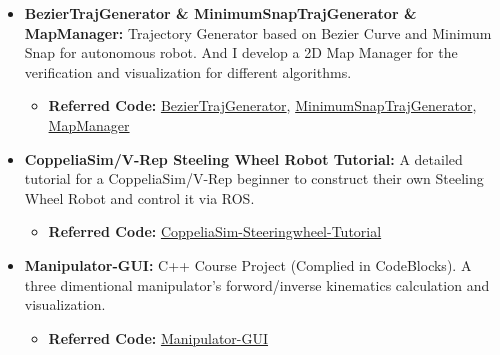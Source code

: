 \documentclass[11pt,a4paper,sans]{moderncv}        %
\begin{document}
{\begin{itemize}
\begin{itemize}
\item \textbf{Referred Code:} \href{https://github.com/jianhengLiu/quad_controller_SE3}{quad-controller-SE3}, \href{https://github.com/jianhengLiu/FlightController}{FlightController}

\item \textbf{Referred Video:} \href{https://www.bilibili.com/video/BV1xv411w7Md?share_source=copy_web}{Video1}, \href{https://www.bilibili.com/video/BV1rq4y1N76T?share_source=copy_web}{Video2}
\end{itemize}

\vspace{6pt}

\item \textbf{BezierTrajGenerator \& MinimumSnapTrajGenerator \& 
MapManager:} Trajectory Generator based on Bezier Curve and Minimum Snap for autonomous robot. And I develop a 2D Map Manager for the verification and visualization for different algorithms.

\begin{itemize}
\item \textbf{Referred Code:} \href{https://github.com/jianhengLiu/BezierTrajGenerator}{BezierTrajGenerator}, \href{https://github.com/jianhengLiu/MinimumSnapTrajGenerator}{MinimumSnapTrajGenerator}, \href{https://github.com/jianhengLiu/MapManager}{MapManager}
\end{itemize}

\vspace{6pt}

\item \textbf{CoppeliaSim/V-Rep Steeling Wheel Robot Tutorial:} A detailed tutorial for a CoppeliaSim/V-Rep beginner to construct their own Steeling Wheel Robot and control it via ROS.

\begin{itemize}
\item \textbf{Referred Code:} \href{https://github.com/jianhengLiu/CoppeliaSim_Steeringwheel_Tutorial}{CoppeliaSim-Steeringwheel-Tutorial}
\end{itemize}
\vspace{6pt}

\item \textbf{Manipulator-GUI:} C++ Course Project (Complied in CodeBlocks). A three dimentional manipulator's forword/inverse kinematics calculation and visualization.

\begin{itemize}
\item \textbf{Referred Code:} \href{https://github.com/jianhengLiu/Manipulator_GUI}{Manipulator-GUI}
\end{itemize}


\end{itemize}}
\end{document}
